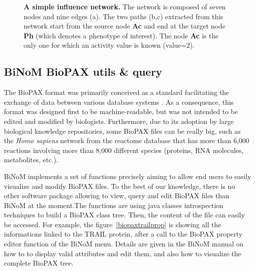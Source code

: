\documentclass[10pt]{bmc_article}
\newenvironment{bmcformat}{\baselineskip20pt\sloppy\setboolean{publ}{false}}{\baselineskip20pt\sloppy}
\begin{document}
\begin{bmcformat}
\begin{figure}[h]
 \caption{\label{piquantnetworks}  \textbf{A simple influence network.} The 
network is composed of seven nodes and nine edges (a). The two paths (b,c)
extracted from this network start from the source node \textbf{Ac} and end at
the target node \textbf{Ph} (which denotes a phenotype of interest). The node
\textbf{Ac} is the only one for which
an activity value is known (value=2).}
\end{figure}

%
%

\subsection*{BiNoM BioPAX utils \& query}
The BioPAX format was primarily conceived as a standard facilitating the
exchange of data between various database systems \cite{demir2010biopax}. As a
consequence, this format was designed first to be machine-readable, but was not
intended
to be edited and modified by biologists. Furthermore, due to its adoption by
large biological knowledge repositories, some BioPAX files can be really big,
such as the \textit{Homo sapiens} network from the reactome database
\cite{joshi2005reactome} that has more than 6,000 reactions involving more than
8,000 different species (proteins, RNA molecules, metabolites, etc.).

BiNoM implements a set of functions precisely aiming to allow end users to
easily visualize and modify BioPAX files. To the best of our knowledge, there is
no other software package allowing to view, query and edit BioPAX files than
BiNoM at the moment.The functions are using
java classes introspection techniques to build a BioPAX class tree. Then, the
content of the file can easily be accessed. For example, the figure~\ref{biopaxtrailprop} is
showing all the informations linked to the TRAIL protein, after a call to the
BioPAX property
editor function of the BiNoM menu. Details are given in the BiNoM manual on how
to to display valid attributes and edit them, and also how to visualize the
complete BioPAX tree.



\end{bmcformat}
\end{document}

